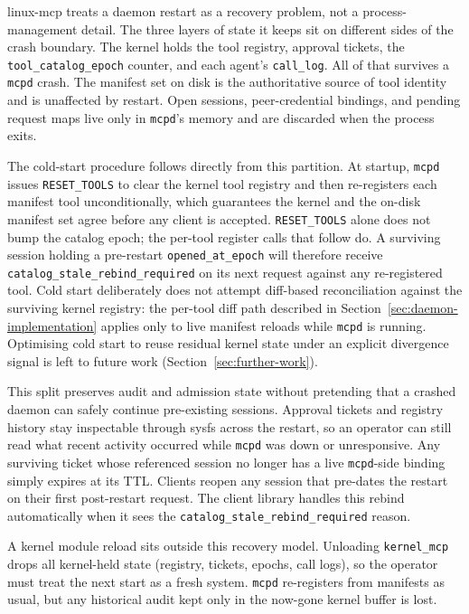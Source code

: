 linux-mcp treats a daemon restart as a recovery problem, not a process-management detail.
The three layers of state it keeps sit on different sides of the crash boundary.
The kernel holds the tool registry, approval tickets, the \texttt{tool\_\allowbreak catalog\_\allowbreak epoch} counter, and each agent's \texttt{call\_\allowbreak log}.
All of that survives a \texttt{mcpd} crash.
The manifest set on disk is the authoritative source of tool identity and is unaffected by restart.
Open sessions, peer-credential bindings, and pending request maps live only in \texttt{mcpd}'s memory and are discarded when the process exits.

The cold-start procedure follows directly from this partition.
At startup, \texttt{mcpd} issues \texttt{RESET\_\allowbreak TOOLS} to clear the kernel tool registry and then re-registers each manifest tool unconditionally, which guarantees the kernel and the on-disk manifest set agree before any client is accepted.
\texttt{RESET\_\allowbreak TOOLS} alone does not bump the catalog epoch; the per-tool register calls that follow do.
A surviving session holding a pre-restart \texttt{opened\_\allowbreak at\_\allowbreak epoch} will therefore receive \texttt{catalog\_\allowbreak stale\_\allowbreak rebind\_\allowbreak required} on its next request against any re-registered tool.
Cold start deliberately does not attempt diff-based reconciliation against the surviving kernel registry: the per-tool diff path described in Section~\ref{sec:daemon-implementation} applies only to live manifest reloads while \texttt{mcpd} is running.
Optimising cold start to reuse residual kernel state under an explicit divergence signal is left to future work (Section~\ref{sec:further-work}).

This split preserves audit and admission state without pretending that a crashed daemon can safely continue pre-existing sessions.
Approval tickets and registry history stay inspectable through sysfs across the restart, so an operator can still read what recent activity occurred while \texttt{mcpd} was down or unresponsive.
Any surviving ticket whose referenced session no longer has a live \texttt{mcpd}-side binding simply expires at its TTL.
Clients reopen any session that pre-dates the restart on their first post-restart request.
The client library handles this rebind automatically when it sees the \texttt{catalog\_\allowbreak stale\_\allowbreak rebind\_\allowbreak required} reason.

A kernel module reload sits outside this recovery model.
Unloading \texttt{kernel\_\allowbreak mcp} drops all kernel-held state (registry, tickets, epochs, call logs), so the operator must treat the next start as a fresh system.
\texttt{mcpd} re-registers from manifests as usual, but any historical audit kept only in the now-gone kernel buffer is lost.




